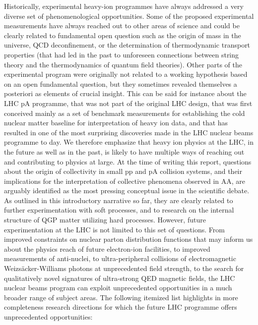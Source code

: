 \documentclass[../report.tex]{subfiles}
\begin{document}
Historically, experimental heavy-ion programmes have always addressed a very diverse set of phenomenological opportunities. Some of the proposed experimental measurements have always reached out to other areas of science and could be clearly related to fundamental open question such as the origin of mass in the universe, QCD deconfinement, or the determination of thermodynamic transport properties (that had led in the past to unforeseen connections between string theory and the thermodynamics of quantum field theories). Other parts of the experimental program were originally not related to a working hypothesis based on an open fundamental question, but they sometimes revealed themselves a posteriori as elements of crucial insight. This can be said for instance about the LHC pA programme, that was not part of the original LHC design, that was first conceived mainly as a set of benchmark measurements for establishing the cold nuclear matter baseline for interpretation of heavy ion data, and that has resulted in one of the most surprising discoveries made in the LHC nuclear beams programme to day. We therefore emphasize that heavy ion physics at the LHC, in the future as well as in the past, is likely to have multiple ways of reaching out and contributing to physics at large. At the time of writing this report, questions about the origin of collectivity in small pp and pA collision systems, and their implications for the interpretation of collective phenomena observed in AA, are arguably identified as the most pressing conceptual issue in the scientific debate. As outlined in this introductory narrative so far, they are clearly related to further experimentation with soft processes, and to research on the internal structure of QGP matter utilizing hard processes.  However, future experimentation at the LHC is not limited to this set of questions. From improved constraints on nuclear parton distribution functions that may inform us about the physics reach of future electron-ion facilities, to improved measurements of anti-nuclei, to ultra-peripheral collisions of electromagnetic Weizsäcker-Williams photons at unprecedented field strength, to the search for qualitatively novel signatures of ultra-strong QED magnetic fields, the LHC nuclear beams program can exploit unprecedented opportunities in a much broader range of subject areas. The following itemized list highlights in more completeness research directions for which the future LHC programme offers unprecedented opportunities:
\end{document}
